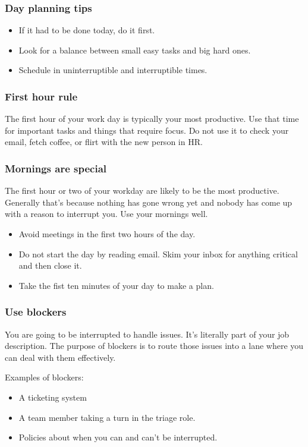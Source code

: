 \documentclass[10pt]{beamer}
\begin{document}
\begin{frame}
  \frametitle{Day planning tips}

  \begin{itemize}
    \item If it had to be done today, do it first.
    \item Look for a balance between small easy tasks and big hard ones.
    \item Schedule in uninterruptible and interruptible times.
  \end{itemize}    
\end{frame}

\begin{frame}
  \frametitle{First hour rule}

  The first hour of your work day is typically your most productive. Use that time 
  for important tasks and things that require focus. Do not use it to check your email,
  fetch coffee, or flirt with the new person in HR.
      
\end{frame}

\begin{frame}
  \frametitle{Mornings are special}
  
  The first hour or two of your workday are likely to be the most productive.
  Generally that's because nothing has gone wrong yet and nobody has come up
  with a reason to interrupt you. Use your mornings well.
  
  \begin{itemize}
    \item Avoid meetings in the first two hours of the day.
    \item Do not start the day by reading email. Skim your inbox for
    anything critical and then close it.
    \item Take the fist ten minutes of your day to make a plan.
  \end{itemize}
     
\end{frame}


\begin{frame}
  \frametitle{Use blockers}
  
  You are going to be interrupted to handle issues. It's literally part of
  your job description. The purpose of blockers is to route those issues into
  a lane where you can deal with them effectively.
  
  Examples of blockers:
  
  \begin{itemize}
    \item A ticketing system
    \item A team member taking a turn in the triage role.
    \item Policies about when you can and can't be interrupted.
  \end{itemize}
     
\end{frame}
\end{document}
